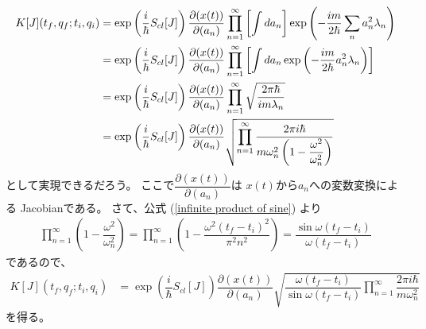 \begin{align}
    K[J]( t_f, q_f ; t_i, q_i )
    &=
    \exp\left(
        \dfrac{i}{\hbar} S_{cl} [J]
    \right)
        \dfrac{ \partial ( x(t) ) }
            { \partial (a_n) }
    \prod_{n=1}^\infty
    \left[
        \int d a_n
    \right]
    \exp\left(
        -
        \dfrac{ i m }{2\hbar}
        \sum_{n}
        a_n^2
        \lambda_n
    \right)
\notag\\&=
    \exp\left(
        \dfrac{i}{\hbar} S_{cl} [J]
    \right)
        \dfrac{ \partial ( x(t) ) }
            { \partial (a_n) }
    \prod_{n=1}^\infty
    \left[
        \int d a_n
        \exp\left(
            -
            \dfrac{ i m }{2\hbar}
            a_n^2
            \lambda_n
        \right)
    \right]
\notag\\&=
    \exp\left(
        \dfrac{i}{\hbar} S_{cl} [J]
    \right)
        \dfrac{ \partial ( x(t) ) }
            { \partial (a_n) }
    \prod_{n=1}^\infty
    \sqrt{
        \dfrac{2 \pi \hbar}{i m \lambda_n}
    }
\notag\\&=
    \exp\left(
        \dfrac{i}{\hbar} S_{cl} [J]
    \right)
        \dfrac{ \partial ( x(t) ) }
            { \partial (a_n) }
    \sqrt{
        \prod_{n=1}^\infty
        \dfrac{2 \pi i \hbar}{
            m \omega_n^2 \left(
                1 - \dfrac{ \omega^2 }{ \omega_n^2 }
            \right)
        }
    }
\end{align}
として実現できるだろう。
ここで$\dfrac{ \partial ( x(t) ) }{ \partial (a_n) }$は
$x(t)$から$a_n$への変数変換による
Jacobianである。
さて、公式
(\ref{infinite product of sine})
より
\begin{align}
    \prod_{n=1}^\infty
    \left(
        1 - \dfrac{ \omega^2 }{ \omega_n^2 }
    \right)
    =
    \prod_{n=1}^\infty
    \left(
        1
        -
        \dfrac{
            \omega^2 (t_f - t_i)^2
        }{ \pi^2 n^2 }
    \right)
    =
    \dfrac{
        \sin \omega (t_f - t_i)
    }{ \omega (t_f - t_i) }
\end{align}
であるので、
\begin{align}
    K[J]( t_f, q_f ; t_i, q_i )
    &=
    \exp\left(
        \dfrac{i}{\hbar} S_{cl} [J]
    \right)
        \dfrac{ \partial ( x(t) ) }
            { \partial (a_n) }
    \sqrt{
        \dfrac{
            \omega (t_f - t_i)
        }{
            \sin \omega (t_f - t_i)
        }
        \prod_{n=1}^\infty
        \dfrac{
            2 \pi i \hbar
        }{
            m \omega_n^2
        }
    }
\end{align}
を得る。

